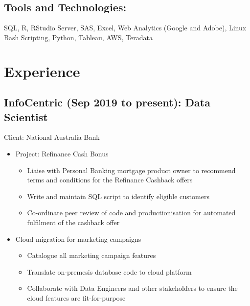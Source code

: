 \documentclass{article}
\begin{document}
\subsection{Tools and Technologies:}
SQL, R, RStudio Server, SAS, Excel, Web Analytics (Google and Adobe), Linux Bash Scripting, Python, Tableau, AWS, Teradata

\section{Experience}


\subsection{InfoCentric (Sep 2019 to present): Data Scientist}
Client: National Australia Bank
\begin{itemize}
    \item Project: Refinance Cash Bonus
        \begin{itemize}
            \item Liaise with Personal Banking mortgage product owner to recommend terms and conditions for the Refinance Cashback offers
            \item Write and maintain SQL script to identify eligible customers
            \item Co-ordinate peer review of code and productionisation for automated fulfilment of the cashback offer
        \end{itemize}
    \item Cloud migration for marketing campaigns
        \begin{itemize}
            \item Catalogue all marketing campaign features
            \item Translate on-premesis database code to cloud platform
            \item Collaborate with Data Engineers and other stakeholders to ensure the cloud features are fit-for-purpose
        \end{itemize}
\end{itemize}
\end{document}
